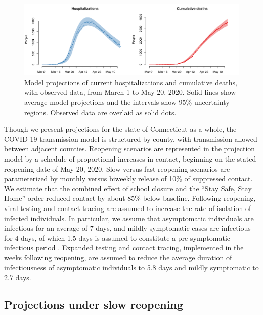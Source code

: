 \documentclass[11pt]{article}
\begin{document}
\begin{figure}
\centering
\includegraphics[width=\textwidth]{figures/calibration.pdf}
\caption{Model projections of current hospitalizations and cumulative deaths, with observed data, from March 1 to May 20, 2020. Solid lines show average model projections and the intervals show 95\% uncertainty regions.  Observed data are overlaid as solid dots.} 
\label{fig:calibration}
\end{figure}

Though we present projections for the state of Connecticut as a whole, the COVID-19 transmission model is structured by county, with transmission allowed between adjacent counties. Reopening scenarios are represented in the projection model by a schedule of proportional increases in contact, beginning on the stated reopening date of May 20, 2020.  Slow versus fast reopening scenarios are parameterized by monthly versus biweekly release of 10\% of suppressed contact.  We estimate that the combined effect of school closure and the ``Stay Safe, Stay Home'' order reduced contact by about $85\%$ below baseline.  Following reopening, viral testing and contact tracing are assumed to increase the rate of isolation of infected individuals. In particular, we assume that asymptomatic individuals are infectious for an average of 7 days, and mildly symptomatic cases are infectious for 4 days, of which 1.5 days is assumed to constitute a pre-symptomatic infectious period \citep{li2020substantial, kissler2020projecting, salje2020estimating, wolfel2020virological, wei2020presymptomatic}. Expanded testing and contact tracing, implemented in the weeks following reopening, are assumed to reduce the average duration of infectiousness of asymptomatic individuals to 5.8 days and mildly symptomatic to 2.7 days. 


\subsection*{Projections under slow reopening} 
\end{document}
